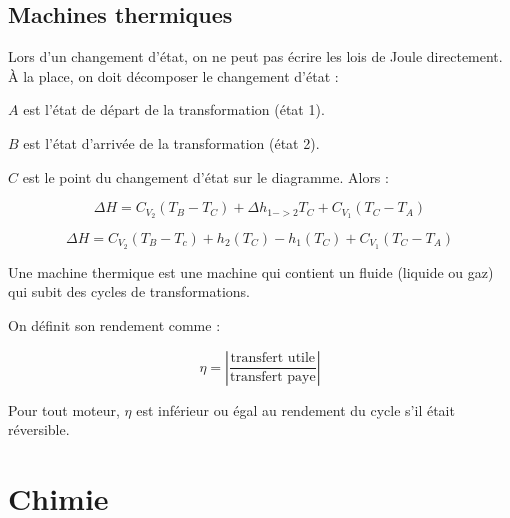 \documentclass[a4paper,12pt]{book}
\newcommand{\Def}[2]{\begin{tcolorbox}[colback=white,colframe=red!10!green!20!blue!75!, title=Définition : #1]#2\end{tcolorbox}}
\newcommand{\Thr}[2]{\begin{tcolorbox}[sharp corners, colback=white,colframe=red!10!blue!30!green!75!, title=Théorème : #1]#2\end{tcolorbox}}
\begin{document}
\subsection{Machines thermiques}
\Thr{Enthalpie de changement d'état}{Lors d'un changement d'état, on ne peut pas écrire les lois de Joule directement. À la place, on doit décomposer le changement d'état :
\par $A$ est l'état de départ de la transformation (état 1).
\par $B$ est l'état d'arrivée de la transformation (état 2).
\par $C$ est le point du changement d'état sur le diagramme.
Alors :
\par $$\Delta H = C_{V_2}(T_B-T_C) + \Delta h_{1->2}T_C+C_{V_1}(T_C-T_A)$$
\par $$\Delta H = C_{V_2}(T_B-T_c) + h_2(T_C)-h_1(T_C) +C_{V_1}(T_C-T_A)$$}
\Def{Machine thermique}{Une machine thermique est une machine qui contient un fluide (liquide ou gaz) qui subit des cycles de transformations.
\par On définit son rendement comme :
\par $$\eta = \left|\frac{\text{transfert utile}}{\text{transfert paye}}\right|$$
\par Pour tout moteur, $\eta$ est inférieur ou égal au rendement du cycle s'il était réversible.}



















\newpage
\section{Chimie}
\end{document}
